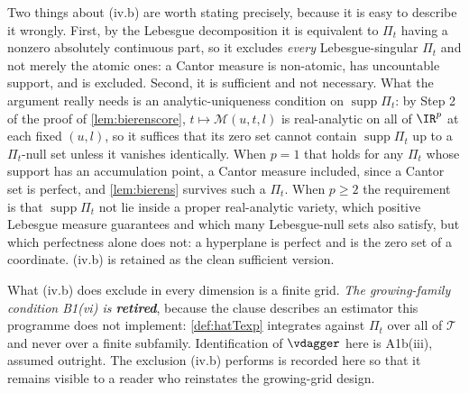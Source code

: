 \begin{remark}
Two things about (iv.b) are worth stating precisely, because it is easy to describe it wrongly. First,
by the Lebesgue decomposition it is equivalent to $\Pi_t$ having a nonzero absolutely continuous part,
so it excludes \emph{every} Lebesgue-singular $\Pi_t$ and not merely the atomic ones: a Cantor measure is
non-atomic, has uncountable support, and is excluded. Second, it is sufficient and not necessary. What
the argument really needs is an analytic-uniqueness condition on $\operatorname{supp}\Pi_t$: by Step 2 of the
proof of \cref{lem:bierenscore}, $t\mapsto\mathcal M(u,t,l)$ is real-analytic on all of $\IR^{p}$ at
each fixed $(u,l)$, so it
suffices that its zero set cannot contain $\operatorname{supp}\Pi_t$ up to a $\Pi_t$-null set unless it
vanishes identically. When $p=1$ that holds for any $\Pi_t$ whose support has an accumulation point, a
Cantor measure included, since a Cantor set is perfect, and \cref{lem:bierens} survives such a
$\Pi_t$. When $p\ge2$ the requirement is that $\operatorname{supp}\Pi_t$ not lie inside a proper
real-analytic variety, which positive Lebesgue measure guarantees and which many Lebesgue-null sets also
satisfy, but which perfectness alone does not: a hyperplane is perfect and is the zero set of a
coordinate. (iv.b) is retained as the clean sufficient version.

What (iv.b) does exclude in every dimension is a finite grid. \emph{The growing-family condition B1(vi)
is \textbf{retired}}, because the clause describes an estimator this programme does not implement:
\cref{def:hatTexp} integrates against $\Pi_t$ over all of $\mathcal T$ and never over a finite subfamily.
Identification of $\vdagger$ here is A1b(iii), assumed outright. The exclusion (iv.b) performs is
recorded here so that it remains visible to a reader who reinstates the growing-grid design.


\end{remark}

